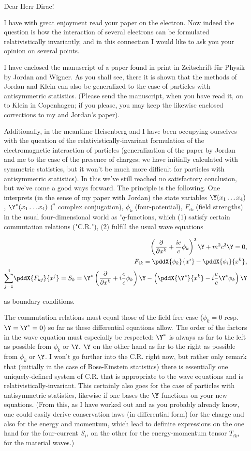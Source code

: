 \documentclass{article}
\newcommand{\uequ}[1]{
\begin{align*}
#1
\end{align*}
}
\newcommand{\sumXY}[2]{\underset{#1}{\overset{#2}{\sum}}}
\begin{document}
Dear Herr Dirac!

I have with great enjoyment read your paper on the electron. Now indeed the question is how the interaction of several electrons can be formulated relativistically invariantly, and in this connection I would like to ask you your opinion on several points.

I have enclosed the manuscript of a paper found in print in Zeitschrift f\"ur Physik by Jordan and Wigner. As you shall see, there it is shown that the methods of Jordan and Klein can also be generalized to the case of particles with antisymmetric statistics. (Please send the manuscript, when you have read it, on to Klein in Copenhagen; if you please, you may keep the likewise enclosed corrections to my and Jordan's paper).

Additionally, in the meantime Heisenberg and I have been occupying ourselves with the queation of the relativistically-invariant formulation of the electromagnetic interaction of particles (generalization of the paper by Jordan and me to the case of the presence of charges; we have initially calculated with symmetric statistics, but it won't be much more difficult for particles with antisymmetric statistics). In this we've still reached no satisfactory conclusion, but we've come a good ways forward. The principle is the following. One interprets (in the sense of my paper with Jordan) the state variables $\Y(x_1 \dots x_4)$, $\Y^*(x_1 \dots x_4)$ (${}^*$ complex conjugation), $\phi_k$ (four-potential), $F_{ik}$ (field strengths) in the usual four-dimensional world as "$q$-functions, which (1) satisfy certain commutation relations ("C.R."), (2) fulfill the usual wave equations
\uequ{
\left(\frac{\partial}{\partial x^k} + \frac{ie}{c}\phi_k \right)^2 \Y + m^2 c^2 \Y = 0,\\
F_{ik} = \pddX{\phi_k}{x^i} - \pddX{\phi_i}{x^k},\\
\sumXY{j=1}{4}\pddX{F_{kj}}{x^j} = S_k = \Y^*
\left(\frac{\partial}{\partial x^k} + i \frac{e}{c} \phi_k \right)\Y
- \left( \pddX{\Y^*}{x^k} - i \frac{e}{c}\Y^* \phi_k \right)\Y
}
as boundary conditions.

The commutation relations must equal those of the field-free case ($\phi_k=0$ resp. $\Y=\Y^*=0$) so far as these differential equations allow. The order of the factors in the wave equation must especially be respected: $\Y^*$ is always as far to the left as possible from $\phi_k$ or $\Y$, $\Y$ on the other hand as far to the right as possible from $\phi_k$ or $\Y$. I won't go further into the C.R. right now, but rather only remark that (initially in the case of Bose-Einstein statistics) there is essentially one uniquely-defined system of C.R. that is appropriate to the wave equations and is relativistically-invariant. This certainly also goes for the case of particles with antisymmetric statistics, likewise if one bases the $\Y$-functions on your new equations. (From this, as I have worked out and as you probably already know, one could easily derive conservation laws (in differential form) for the charge and also for the energy and momentum, which lead to definite expressions on the one hand for the four-current $S_i$, on the other for the energy-momentum tensor $T_{ik}$, for the material waves.)
\end{document}
